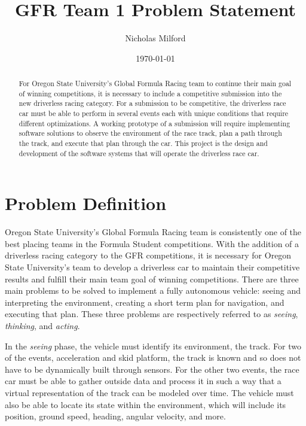 \documentclass[10pt,draftclsnofoot,onecolumn]{article}
\title{GFR Team 1 Problem Statement}
\author{Nicholas Milford}
\date{\today}
\begin{document}
\maketitle

\begin{abstract}
\noindent
For Oregon State University's Global Formula Racing team to continue their main goal of winning competitions, it is necessary to include a competitive submission into the new driverless racing category. For a submission to be competitive, the driverless race car must be able to perform in several events each with unique conditions that require different optimizations. A working prototype of a submission will require implementing software solutions to observe the environment of the race track, plan a path through the track, and execute that plan through the car. This project is the design and development of the software systems that will operate the driverless race car. 
\end{abstract} 

\thispagestyle{empty}

\section{Problem Definition}
Oregon State University's Global Formula Racing team is consistently one of the best placing teams in the Formula Student competitions. With the addition of a driverless racing category to the GFR competitions, it is necessary for Oregon State University's team to develop a driverless car to maintain their competitive results and fulfill their main team goal of winning competitions. There are three main problems to be solved to implement a fully autonomous vehicle: seeing and interpreting the environment, creating a short term plan for navigation, and executing that plan. These three problems are respectively referred to as \textit{seeing}, \textit{thinking}, and \textit{acting}.

In the \textit{seeing} phase, the vehicle must identify its environment, the track. For two of the events, acceleration and skid platform, the track is known and so does not have to be dynamically built through sensors. For the other two events, the race car must be able to gather outside data and process it in such a way that a virtual representation of the track can be modeled over time. The vehicle must also be able to locate its state within the environment, which will include its position, ground speed, heading, angular velocity, and more.
\end{document}

